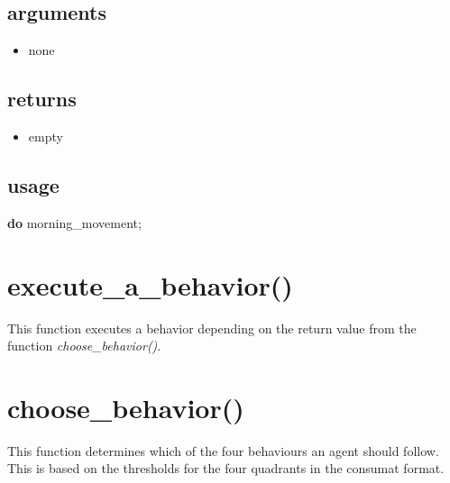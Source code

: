 \documentclass[]{book}
\newenvironment{Shaded}{\begin{snugshade}}{\end{snugshade}}
\newcommand{\KeywordTok}[1]{\textcolor[rgb]{0.13,0.29,0.53}{\textbf{#1}}}
\newcommand{\NormalTok}[1]{#1}
\providecommand{\tightlist}{%
  \setlength{\itemsep}{0pt}\setlength{\parskip}{0pt}}
\theoremstyle{definition}
\theoremstyle{definition}
\theoremstyle{definition}
\theoremstyle{remark}
\begin{document}
\hypertarget{arguments-2}{%
\subsection*{arguments}\label{arguments-2}}

\begin{itemize}
\tightlist
\item
  none
\end{itemize}

\hypertarget{returns-2}{%
\subsection*{returns}\label{returns-2}}

\begin{itemize}
\tightlist
\item
  empty
\end{itemize}

\hypertarget{usage-2}{%
\subsection*{usage}\label{usage-2}}

\begin{Shaded}
\begin{Highlighting}[]
\KeywordTok{do}\NormalTok{ morning_movement;}
\end{Highlighting}
\end{Shaded}

\hypertarget{execute_a_behavior}{%
\section{execute\_a\_behavior()}\label{execute_a_behavior}}

This function executes a behavior depending on the return value from the
function \emph{choose\_behavior()}.

\hypertarget{choose_behavior}{%
\section{choose\_behavior()}\label{choose_behavior}}

This function determines which of the four behaviours an agent should
follow. This is based on the thresholds for the four quadrants in the
consumat format. 
\end{document}
